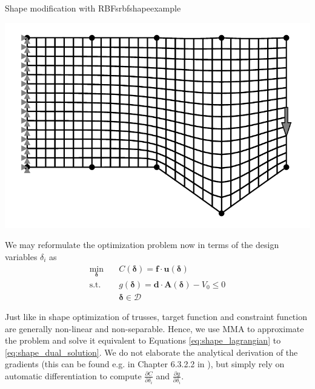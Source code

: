 \begin{example}{Shape modification with RBFs}{rbfshapeexample}
\begin{minipage}{.5\textwidth}
    \end{minipage}%
    \begin{minipage}{.5\textwidth}
        \centering
        \includegraphics[width=0.9\linewidth]{figures/cantilever_fem_shape_3_linear.pdf}
    \end{minipage}
\end{example}

We may reformulate the optimization problem now in terms of the design variables $\delta_i$ as 
\begin{equation}
    \begin{aligned}
        \min_{\pmb{\delta}} \quad & C(\pmb{\delta}) = \mathbf{f} \cdot \mathbf{u}(\pmb{\delta})\\
        \textrm{s.t.} \quad & g(\pmb{\delta}) = \mathbf{d} \cdot \mathbf{A}(\pmb{\delta}) - V_0 \le 0  \\
                            & \pmb{\delta} \in \mathcal{D}
    \end{aligned}
    \label{eq:shape_optimization_morph}
\end{equation}

Just like in shape optimization of trusses, target function and constraint function are generally non-linear and non-separable. Hence, we use MMA to approximate the problem and solve it equivalent to Equations \eqref{eq:shape_lagrangian} to \eqref{eq:shape_dual_solution}. We do not elaborate the analytical derivation of the gradients (this can be found e.g. in Chapter 6.3.2.2 in \cite{Christensen2008}), but simply rely on automatic differentiation to compute $\frac{\partial C}{\partial \delta_i}$ and $\frac{\partial g}{\partial \delta_i}$.


